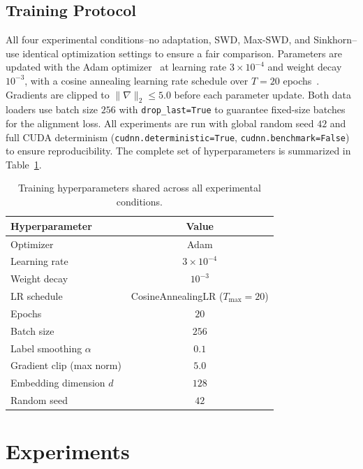 \documentclass{article}
\begin{document}
	\subsection{Training Protocol}
	
	All four experimental conditions--no adaptation, SWD, Max-SWD, and Sinkhorn--use identical optimization settings to ensure a fair comparison. Parameters are updated with the Adam optimizer~\citep{kingma} at learning rate $3 \times 10^{-4}$ and weight decay $10^{-3}$, with a cosine annealing learning rate schedule over $T = 20$ epochs~\citep{loshchilov}. Gradients are clipped to $\|\nabla\|_2 \leq 5.0$ before each parameter update. Both data loaders use batch size $256$ with \texttt{drop\_last=True} to guarantee fixed-size batches for the alignment loss. All experiments are run with global random seed $42$ and full CUDA determinism (\texttt{cudnn.deterministic=True}, \texttt{cudnn.benchmark=False}) to ensure reproducibility. The complete set of hyperparameters is summarized in Table~\ref{tab:hyperparams}.
	
	\begin{table}[h]
		\centering
		\caption{Training hyperparameters shared across all experimental conditions.}
		\label{tab:hyperparams}
		\begin{tabular}{lc}
			\toprule
			\textbf{Hyperparameter} & \textbf{Value} \\
			\midrule
			Optimizer & Adam \\
			Learning rate & $3 \times 10^{-4}$ \\
			Weight decay & $10^{-3}$ \\
			LR schedule & CosineAnnealingLR ($T_{\max} = 20$) \\
			Epochs & $20$ \\
			Batch size & $256$ \\
			Label smoothing $\alpha$ & $0.1$ \\
			Gradient clip (max norm) & $5.0$ \\
			Embedding dimension $d$ & $128$ \\
			Random seed & $42$ \\
			\bottomrule
		\end{tabular}
	\end{table}
	
	
	
	
	
	\section{Experiments}
	
\end{document}
